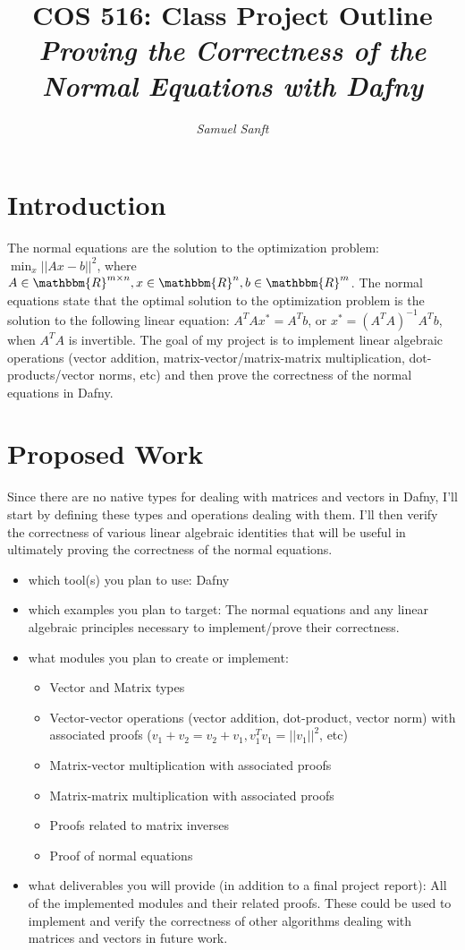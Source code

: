 \documentclass[10pt]{article}
\title{COS 516: Class Project Outline\\
\emph{Proving the Correctness of the Normal Equations with Dafny}}
\author{\emph{Samuel Sanft}}
\begin{document}
\maketitle

\section{Introduction}

The normal equations are the solution to the optimization problem: $\min_x ||Ax - b||^2$, where $A \in \mathbbm{R}^{m \times n}, x \in \mathbbm{R}^{n}, b \in \mathbbm{R}^{m}$. The normal equations state that the optimal solution to the optimization problem is the solution to the following linear equation: $A^T A x^* = A^T b$, or $x^* = (A^T A)^{-1} A^T b$, when $A^T A$ is invertible. The goal of my project is to implement linear algebraic operations (vector addition, matrix-vector/matrix-matrix multiplication, dot-products/vector norms, etc) and then prove the correctness of the normal equations in Dafny.

\section{Proposed Work}

Since there are no native types for dealing with matrices and vectors in Dafny, I'll start by defining these types and operations dealing with them. I'll then verify the correctness of various linear algebraic identities that will be useful in ultimately proving the correctness of the normal equations.
\begin{itemize}
\item which tool(s) you plan to use: Dafny
\item which examples you plan to target: The normal equations and any linear algebraic principles necessary to implement/prove their correctness.
\item what modules you plan to create or implement: 
	\begin{itemize}
	\item Vector and Matrix types
	\item Vector-vector operations (vector addition, dot-product, vector norm) with associated proofs ($v_1 + v_2 = v_2 + v_1, v_1^T v_1 = ||v_1||^2$, etc)
	\item Matrix-vector multiplication with associated proofs
	\item Matrix-matrix multiplication with associated proofs
	\item Proofs related to matrix inverses
	\item Proof of normal equations 
	\end{itemize}
\item what deliverables you will provide (in addition to a final project report): All of the implemented modules and their related proofs. These could be used to implement and verify the correctness of other algorithms dealing with matrices and vectors in future work.
\end{itemize}
\end{document}
